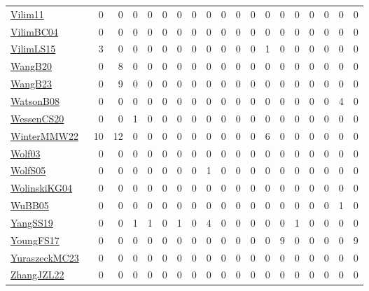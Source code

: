 {\begin{longtable}{l*{18}{r}}
\href{papers/Vilim11.pdf}{Vilim11}~\cite{Vilim11} & 0 & 0 & 0 & 0 & 0 & 0 & 0 & 0 & 0 & 0 & 0 & 0 & 0 & 0 & 0 & 0 & 0 & 0\\
\href{papers/VilimBC04.pdf}{VilimBC04}~\cite{VilimBC04} & 0 & 0 & 0 & 0 & 0 & 0 & 0 & 0 & 0 & 0 & 0 & 0 & 0 & 0 & 0 & 0 & 0 & 0\\
\href{papers/VilimLS15.pdf}{VilimLS15}~\cite{VilimLS15} & 3 & 0 & 0 & 0 & 0 & 0 & 0 & 0 & 0 & 0 & 0 & 1 & 0 & 0 & 0 & 0 & 0 & 0\\
\href{papers/WangB20.pdf}{WangB20}~\cite{WangB20} & 0 & 8 & 0 & 0 & 0 & 0 & 0 & 0 & 0 & 0 & 0 & 0 & 0 & 0 & 0 & 0 & 0 & 0\\
\href{papers/WangB23.pdf}{WangB23}~\cite{WangB23} & 0 & 9 & 0 & 0 & 0 & 0 & 0 & 0 & 0 & 0 & 0 & 0 & 0 & 0 & 0 & 0 & 0 & 0\\
\href{papers/WatsonB08.pdf}{WatsonB08}~\cite{WatsonB08} & 0 & 0 & 0 & 0 & 0 & 0 & 0 & 0 & 0 & 0 & 0 & 0 & 0 & 0 & 0 & 0 & 4 & 0\\
\href{papers/WessenCS20.pdf}{WessenCS20}~\cite{WessenCS20} & 0 & 0 & 1 & 0 & 0 & 0 & 0 & 0 & 0 & 0 & 0 & 0 & 0 & 0 & 0 & 0 & 0 & 0\\
\href{papers/WinterMMW22.pdf}{WinterMMW22}~\cite{WinterMMW22} & 10 & 12 & 0 & 0 & 0 & 0 & 0 & 0 & 0 & 0 & 0 & 6 & 0 & 0 & 0 & 0 & 0 & 0\\
\href{papers/Wolf03.pdf}{Wolf03}~\cite{Wolf03} & 0 & 0 & 0 & 0 & 0 & 0 & 0 & 0 & 0 & 0 & 0 & 0 & 0 & 0 & 0 & 0 & 0 & 0\\
\href{papers/WolfS05.pdf}{WolfS05}~\cite{WolfS05} & 0 & 0 & 0 & 0 & 0 & 0 & 0 & 1 & 0 & 0 & 0 & 0 & 0 & 0 & 0 & 0 & 0 & 0\\
\href{papers/WolinskiKG04.pdf}{WolinskiKG04}~\cite{WolinskiKG04} & 0 & 0 & 0 & 0 & 0 & 0 & 0 & 0 & 0 & 0 & 0 & 0 & 0 & 0 & 0 & 0 & 0 & 0\\
\href{papers/WuBB05.pdf}{WuBB05}~\cite{WuBB05} & 0 & 0 & 0 & 0 & 0 & 0 & 0 & 0 & 0 & 0 & 0 & 0 & 0 & 0 & 0 & 0 & 1 & 0\\
\href{papers/YangSS19.pdf}{YangSS19}~\cite{YangSS19} & 0 & 0 & 1 & 1 & 0 & 1 & 0 & 4 & 0 & 0 & 0 & 0 & 0 & 1 & 0 & 0 & 0 & 0\\
\href{papers/YoungFS17.pdf}{YoungFS17}~\cite{YoungFS17} & 0 & 0 & 0 & 0 & 0 & 0 & 0 & 0 & 0 & 0 & 0 & 0 & 9 & 0 & 0 & 0 & 0 & 9\\
\href{papers/YuraszeckMC23.pdf}{YuraszeckMC23}~\cite{YuraszeckMC23} & 0 & 0 & 0 & 0 & 0 & 0 & 0 & 0 & 0 & 0 & 0 & 0 & 0 & 0 & 0 & 0 & 0 & 0\\
\href{papers/ZhangJZL22.pdf}{ZhangJZL22}~\cite{ZhangJZL22} & 0 & 0 & 0 & 0 & 0 & 0 & 0 & 0 & 0 & 0 & 0 & 0 & 0 & 0 & 0 & 0 & 0 & 0\\

\end{longtable}}
